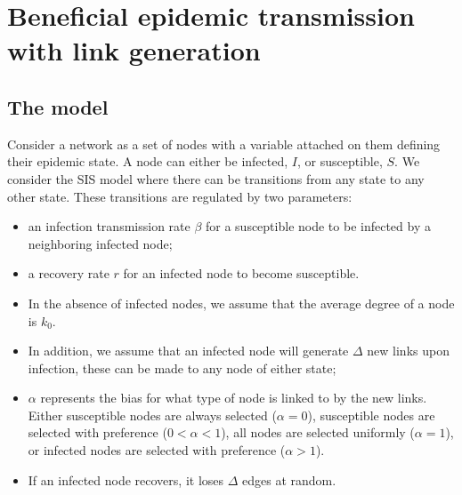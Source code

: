 \documentclass[11pt,final]{article}
\begin{document}
\section*{Beneficial epidemic transmission with link generation}

\subsection*{The model}
Consider a network as a set of nodes with a variable attached on them defining their epidemic state. A node can either be infected, $I$, or susceptible, $S$. We consider the SIS model where there can be transitions from any state to any other state. These transitions are regulated by two parameters:
\begin{itemize}
\item an infection transmission rate $\beta$ for a susceptible node to be infected by a neighboring infected node; 
\item a recovery rate $r$ for an infected node to become susceptible.
\item In the absence of infected nodes, we assume that the average degree of a node is $k_0$.
\item In addition, we assume that an infected node will generate $\Delta$ new links upon infection, these can be made to any node of either state;
\item $\alpha$ represents the bias for what type of node is linked to by the new links. Either susceptible nodes are always selected ($\alpha=0$), susceptible
    nodes are selected with preference ($0<\alpha<1$), all nodes are selected uniformly ($\alpha=1$), or infected nodes are selected with preference ($\alpha>1$).
\item If an infected node recovers, it loses $\Delta$ edges at random.
\end{itemize}
\end{document}
